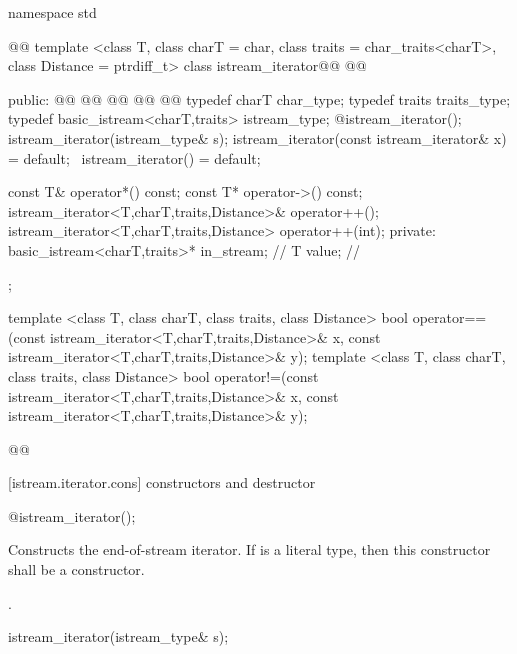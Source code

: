 \begin{codeblock}
namespace std { @@
  template <class T, class charT = char, class traits = char_traits<charT>,
      class Distance = ptrdiff_t>
  class istream_iterator@\removed{:}@
    @@ {
  public:
    @@
    @@
    @@
    @@
    @@
    typedef charT char_type;
    typedef traits traits_type;
    typedef basic_istream<charT,traits> istream_type;
    @\seebelow@ istream_iterator();
    istream_iterator(istream_type& s);
    istream_iterator(const istream_iterator& x) = default;
   ~istream_iterator() = default;

    const T& operator*() const;
    const T* operator->() const;
    istream_iterator<T,charT,traits,Distance>& operator++();
    istream_iterator<T,charT,traits,Distance>  operator++(int);
  private:
    basic_istream<charT,traits>* in_stream; // \expos
    T value;                                // \expos
  };

  template <class T, class charT, class traits, class Distance>
    bool operator==(const istream_iterator<T,charT,traits,Distance>& x,
            const istream_iterator<T,charT,traits,Distance>& y);
  template <class T, class charT, class traits, class Distance>
    bool operator!=(const istream_iterator<T,charT,traits,Distance>& x,
            const istream_iterator<T,charT,traits,Distance>& y);
}@\newtxt{\}\}}@
\end{codeblock}

[istream.iterator.cons]{ constructors and destructor}


%
\begin{itemdecl}
@\seebelow@ istream_iterator();
\end{itemdecl}

\begin{itemdescr}
\pnum
\effects
Constructs the end-of-stream iterator. If  is a literal type, then this
constructor shall be a  constructor.

\pnum
\postcondition {}.
\end{itemdescr}


%
\begin{itemdecl}
istream_iterator(istream_type& s);
\end{itemdecl}

